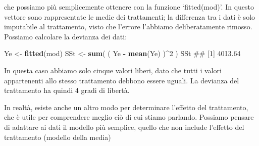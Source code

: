 \documentclass[a4paper,12pt,oneside]{book}
\newenvironment{Shaded}{\begin{snugshade}}{\end{snugshade}}
\newcommand{\KeywordTok}[1]{\textcolor[rgb]{0.13,0.29,0.53}{\textbf{#1}}}
\newcommand{\DecValTok}[1]{\textcolor[rgb]{0.00,0.00,0.81}{#1}}
\newcommand{\StringTok}[1]{\textcolor[rgb]{0.31,0.60,0.02}{#1}}
\newcommand{\OperatorTok}[1]{\textcolor[rgb]{0.81,0.36,0.00}{\textbf{#1}}}
\newcommand{\NormalTok}[1]{#1}
\theoremstyle{definition}
\theoremstyle{definition}
\theoremstyle{definition}
\theoremstyle{remark}
\begin{document}
\begin{Shaded}
\end{Shaded}

che possiamo più semplicemente ottenere con la funzione `fitted(mod)'.
In questo vettore sono rappresentate le medie dei trattamenti; la
differenza tra i dati è solo imputabile al trattamento, visto che
l'errore l'abbiamo deliberatamente rimosso. Possiamo calcolare la
devianza dei dati:

\begin{Shaded}
\begin{Highlighting}[]
\NormalTok{Ye <-}\StringTok{ }\KeywordTok{fitted}\NormalTok{(mod)}
\NormalTok{SSt <-}\StringTok{ }\KeywordTok{sum}\NormalTok{( ( Ye }\OperatorTok{-}\StringTok{ }\KeywordTok{mean}\NormalTok{(Ye) )}\OperatorTok{^}\DecValTok{2}\NormalTok{ )}
\NormalTok{SSt}
\NormalTok{## [1] 4013.64}
\end{Highlighting}
\end{Shaded}

In questa caso abbiamo solo cinque valori liberi, dato che tutti i
valori appartenenti allo stesso trattamento debbono essere uguali. La
devianza del trattamento ha quindi 4 gradi di libertà.

In realtà, esiste anche un altro modo per determinare l'effetto del
trattamento, che è utile per comprendere meglio ciò di cui stiamo
parlando. Possiamo pensare di adattare ai dati il modello più semplice,
quello che non include l'effetto del trattamento (modello della media)
\end{document}
